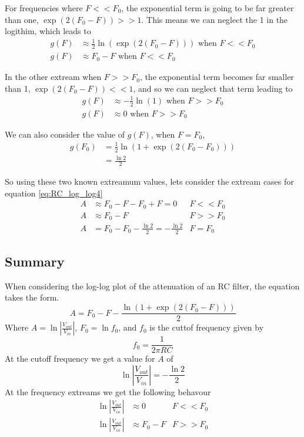 For frequencies where $F << F_0$, the exponential term is going to be far greater
than one, $\exp \left( 2 (F_0 - F) \right) >> 1$. This means we can neglect the
1 in the logithim, which leads to
\begin{align}
  g(F) &\approx \frac{1}{2}\ln\left(\exp \left( 2 (F_0 - F) \right)\right) \text{ when } F<<F_0 \nonumber \\
  g(F) &\approx F_0 - F  \text{ when } F<<F_0
\end{align}

In the other extream when $F>>F_0$, the exponential term becomes far smaller than 1,
$\exp \left( 2 (F_0 - F) \right) << 1$, and so we can neglect that term leading to
\begin{align}
  g(F) &\approx -\frac{1}{2}\ln\left(1\right) \text{ when } F>>F_0 \nonumber \\
  g(F) &\approx 0  \text{ when } F>>F_0
\end{align}

We can also consider the value of $g(F)$, when $F=F_0$,
\begin{align}
  g(F_0) &= \frac{1}{2}\ln\left(1+\exp \left( 2 (F_0 - F_0) \right)\right) \nonumber \\
  &= \frac{\ln 2}{2}
\end{align}

So using these two known extreamum values, lets consider the extream cases for
equation \ref{eq:RC_log_log4}
\begin{align}
  A &\approx F_0 -F - F_0 + F = 0 & F<<F_0 \nonumber \\
  A &\approx F_0 -F &F>>F_0 \nonumber \\
  A &= F_0 -F_0 - \frac{\ln 2}{2} = - \frac{\ln 2}{2}&F=F_0
\end{align}

\begin{framed}
\subsection*{Summary}
When considering the log-log plot of the attenuation of an RC filter, the equation
takes the form.
\begin{equation*}
  A = F_0 -F -\frac{\ln\left(1+\exp \left( 2 (F_0 - F) \right)\right)}{2}
\end{equation*}
Where $A=\ln \left|\frac{V_{out}}{V_{in}}\right|$, $F_0 = \ln f_0$, and $f_0$ is the cuttof frequency given by
\begin{equation*}
  f_0 = \frac{1}{2\pi R C}
\end{equation*}
At the cutoff frequency we get a value for $A$ of
\begin{equation*}
   \ln \left|\frac{V_{out}}{V_{in}}\right| = - \frac{\ln 2}{2}
\end{equation*}
At the frequency extreams we get the following behavour
\begin{align*}
  \ln \left|\frac{V_{out}}{V_{in}}\right| &\approx 0 & F<<F_0  \\
  \ln \left|\frac{V_{out}}{V_{in}}\right| &\approx F_0 -F &F>>F_0
\end{align*}
\end{framed}
